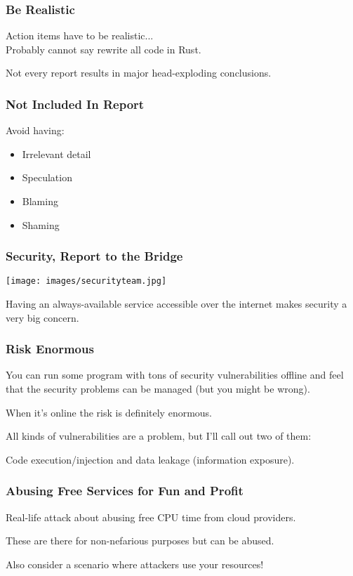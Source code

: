 \begin{frame}
\frametitle{Be Realistic}

Action items have to be realistic...\\
\quad Probably cannot say rewrite all code in Rust.

Not every report results in major head-exploding conclusions.

\end{frame}


\begin{frame}
\frametitle{Not Included In Report}

Avoid having:

\begin{itemize}
	\item Irrelevant detail
	\item Speculation
	\item Blaming
	\item Shaming
\end{itemize}


\end{frame}




\begin{frame}
\frametitle{Security, Report to the Bridge}

\begin{center}
	\texttt{[image: images/securityteam.jpg]}
\end{center}

Having an always-available service accessible over the internet makes security a very big concern.

\end{frame}

\begin{frame}
\frametitle{Risk Enormous}

You can run some program with tons of security vulnerabilities offline and feel that the security problems can be managed (but you might be wrong). 

When it's online the risk is definitely enormous. 

All kinds of vulnerabilities are a problem, but I'll call out two of them:

Code execution/injection and data leakage (information exposure). 


\end{frame}


\begin{frame}
\frametitle{Abusing Free Services for Fun and Profit}

Real-life attack about abusing free CPU time from cloud providers.

These are there for non-nefarious purposes but can be abused.

Also consider a scenario where attackers use your resources!

\end{frame}


